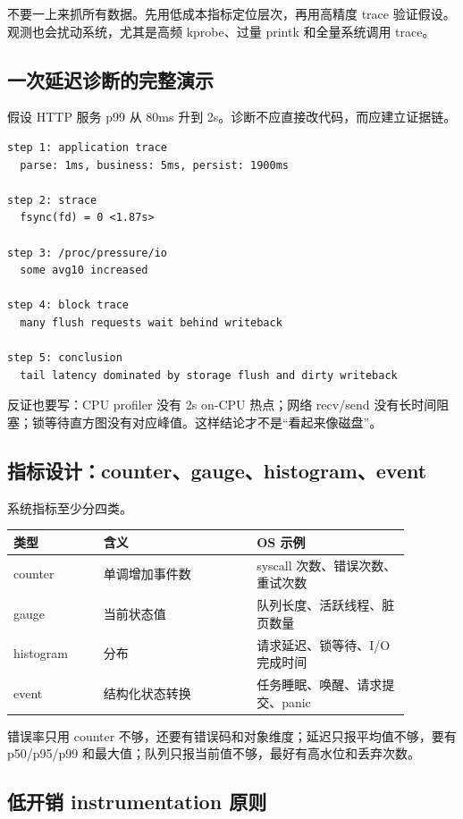 不要一上来抓所有数据。先用低成本指标定位层次，再用高精度 trace 验证假设。观测也会扰动系统，尤其是高频 kprobe、过量 printk 和全量系统调用 trace。

\subsection{一次延迟诊断的完整演示}

假设 HTTP 服务 p99 从 80ms 升到 2s。诊断不应直接改代码，而应建立证据链。

\begin{lstlisting}
step 1: application trace
  parse: 1ms, business: 5ms, persist: 1900ms

step 2: strace
  fsync(fd) = 0 <1.87s>

step 3: /proc/pressure/io
  some avg10 increased

step 4: block trace
  many flush requests wait behind writeback

step 5: conclusion
  tail latency dominated by storage flush and dirty writeback
\end{lstlisting}

反证也要写：CPU profiler 没有 2s on-CPU 热点；网络 recv/send 没有长时间阻塞；锁等待直方图没有对应峰值。这样结论才不是“看起来像磁盘”。

\subsection{指标设计：counter、gauge、histogram、event}

系统指标至少分四类。

\begin{longtable}{|p{0.2\linewidth}|p{0.34\linewidth}|p{0.34\linewidth}|}
\toprule
类型 & 含义 & OS 示例 \\
\midrule
counter & 单调增加事件数 & syscall 次数、错误次数、重试次数 \\\tablerowrule
gauge & 当前状态值 & 队列长度、活跃线程、脏页数量 \\\tablerowrule
histogram & 分布 & 请求延迟、锁等待、I/O 完成时间 \\\tablerowrule
event & 结构化状态转换 & 任务睡眠、唤醒、请求提交、panic \\
\bottomrule
\end{longtable}

错误率只用 counter 不够，还要有错误码和对象维度；延迟只报平均值不够，要有 p50/p95/p99 和最大值；队列只报当前值不够，最好有高水位和丢弃次数。

\subsection{低开销 instrumentation 原则}

